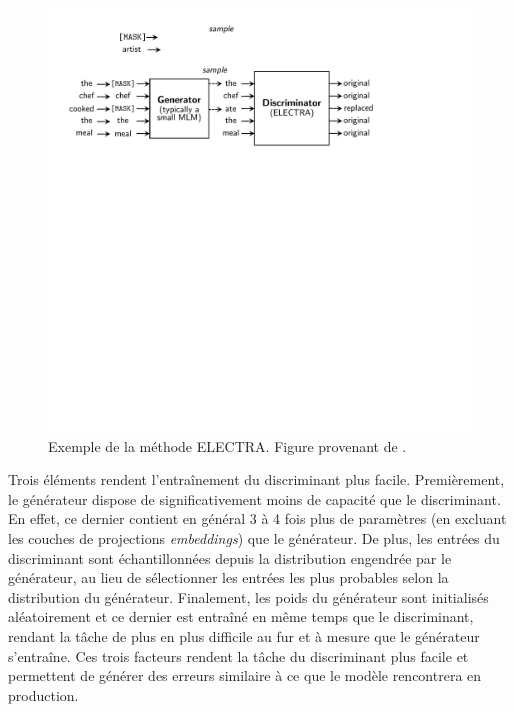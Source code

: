 \documentclass[12pt,twoside,maitrise]{dms}
\theoremstyle{definition}
\numberwithin{equation}{section}
\numberwithin{table}{chapter}
\numberwithin{figure}{chapter}
\begin{document}
\begin{figure}
	\begin{center}
		\includegraphics[width=1.0\textwidth]{figures/electra_entr.pdf}
	\end{center}
	\caption{Exemple de la méthode ELECTRA. Figure provenant de \cite{clark2020electrapretrainingtextencoders}.}
	\label{fig:electra}
\end{figure}

Trois éléments rendent l'entraînement du discriminant plus facile.
Premièrement, le générateur dispose de significativement moins de capacité que
le discriminant. En effet, ce dernier contient en général 3 à 4 fois plus de
paramètres (en excluant les couches de projections \textit{embeddings}) que le
générateur. De plus, les entrées du discriminant sont échantillonnées depuis la
distribution engendrée par le générateur, au lieu de sélectionner les entrées
les plus probables selon la distribution du générateur. Finalement, les poids
du générateur sont initialisés aléatoirement et ce dernier est entraîné en même
temps que le discriminant, rendant la tâche de plus en plus difficile au fur et
à mesure que le générateur s'entraîne. Ces trois facteurs rendent la tâche du
discriminant plus facile et permettent de générer des erreurs similaire à ce
que le modèle rencontrera en production.\\
\end{document}
